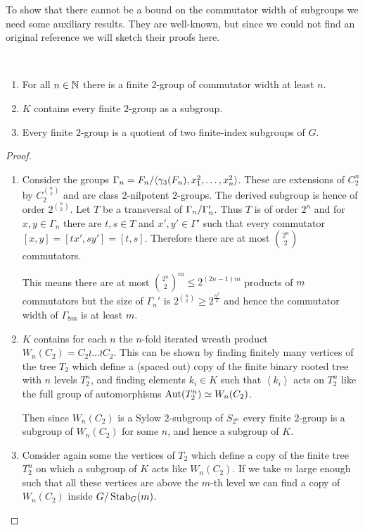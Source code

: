 \documentclass[a4paper,11pt]{amsart}
\begin{document}
To show that there cannot be a bound on the commutator width of subgroups
we need some auxiliary results. They are well-known, but since we could not find an original reference we will
sketch their proofs here.

\begin{pro}\ 
 \begin{enumerate}
  \item For all $n\in\mathbb{N}$ there is a finite $2$-group of commutator width at least $n$.
  \item $K$ contains every finite $2$-group as a subgroup.
  \item Every finite $2$-group is a quotient of two finite-index subgroups of $G$.
 \end{enumerate}
\end{pro}
\begin{proof}\
 \begin{enumerate}
  \item Consider the groups $\Gamma_n={F_n/\langle \gamma_3(F_n),x_1^2,\dotsc,x_n^2\rangle}$. 
  These are extensions of $C_2^n$ by $C_2^{\binom{n}{2}}$ and are class $2$-nilpotent $2$-groups.
  The derived subgroup is hence of order $2^{\binom{n}{2}}$.
  Let $T$ be a transversal of ${\Gamma_n/\Gamma_n'}$. Thus $T$ is of order $2^n$ and
  for $x,y\in\Gamma_n$ there are $t,s\in T$ and $x',y'\in\Gamma'$ such that
  every commutator $[x,y]=[tx',sy']=[t,s]$. Therefore there are at most $\binom{2^n}{2}$ commutators.
  
  This means there are at most $\binom{2^n}{2}^m\leq 2^{(2n-1)m}$ products of $m$ commutators 
  but the size of $\Gamma_n'$ is $2^{\binom{n}{2}} \geq2^{\frac{n^2}{4}}$ and hence 
  the commutator width of $\Gamma_{8m}$ is at least $m$.
  \item  $K$ contains for each $n$ the $n$-fold iterated wreath product
  $W_n(C_2)=C_2\wr \dots \wr C_2$. 
  This can be shown by finding finitely many vertices of the tree $T_2$ which
  define a (spaced out) copy of the finite binary rooted tree with $n$ levels $T_2^n$, and finding 
  elements $k_i\in K$ such that $\left<k_i\right>$ acts on $T_2^n$ like the full group of 
  automorphisms $\operatorname{{Aut}}(T_2^n)\simeq W_n(C_2)$.
  
  Then 
  since $W_n(C_2)$ is a Sylow $2$-subgroup of $S_{2^n}$ every finite $2$-group is a subgroup of
  $W_n(C_2)$ for some $n$, and hence a subgroup of $K$.
\item Consider again some the vertices of $T_2$ which define a copy of
  the finite tree $T_2^n$ on which a subgroup of $K$ acts like
  $W_n(C_2)$. If we take $m$ large enough such that all these vertices
  are above the $m$-th level we can find a copy of $W_n(C_2)$ inside
  ${G/\operatorname{Stab}_G(m)}$.\qedhere
 \end{enumerate}
\end{proof}
\end{document}
